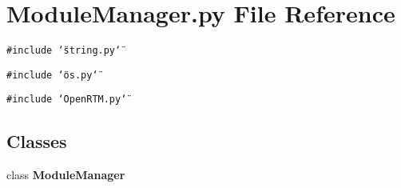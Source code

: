 \section{Module\-Manager.py File Reference}
\label{ModuleManager_8py}
{\tt \#include \char`\"{}string.py\char`\"{}}\par
{\tt \#include \char`\"{}os.py\char`\"{}}\par
{\tt \#include \char`\"{}Open\-RTM.py\char`\"{}}\par
\subsection*{Classes}
\begin{CompactItemize}
\item 
class {\bf Module\-Manager}
\end{CompactItemize}
